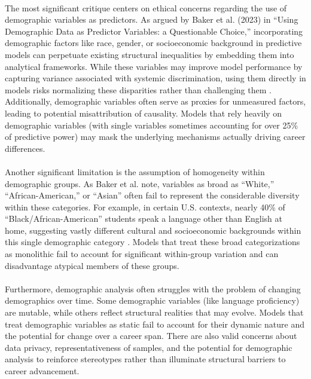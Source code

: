 \documentclass[../main.tex]{subfiles}
\begin{document}
\paragraph{} The most significant critique centers on ethical concerns regarding the use of demographic variables as predictors. As argued by Baker et al. (2023) in ``Using Demographic Data as Predictor Variables: a Questionable Choice,'' incorporating demographic factors like race, gender, or socioeconomic background in predictive models can perpetuate existing structural inequalities by embedding them into analytical frameworks. While these variables may improve model performance by capturing variance associated with systemic discrimination, using them directly in models risks normalizing these disparities rather than challenging them \citep{baker2023demographic}. Additionally, demographic variables often serve as proxies for unmeasured factors, leading to potential misattribution of causality. Models that rely heavily on demographic variables (with single variables sometimes accounting for over 25\% of predictive power) may mask the underlying mechanisms actually driving career differences.

\paragraph{} Another significant limitation is the assumption of homogeneity within demographic groups. As Baker et al. note, variables as broad as ``White,'' ``African-American,'' or ``Asian'' often fail to represent the considerable diversity within these categories. For example, in certain U.S. contexts, nearly 40\% of ``Black/African-American'' students speak a language other than English at home, suggesting vastly different cultural and socioeconomic backgrounds within this single demographic category \citep{baker2023demographic}. Models that treat these broad categorizations as monolithic fail to account for significant within-group variation and can disadvantage atypical members of these groups.

\paragraph{} Furthermore, demographic analysis often struggles with the problem of changing demographics over time. Some demographic variables (like language proficiency) are mutable, while others reflect structural realities that may evolve. Models that treat demographic variables as static fail to account for their dynamic nature and the potential for change over a career span. There are also valid concerns about data privacy, representativeness of samples, and the potential for demographic analysis to reinforce stereotypes rather than illuminate structural barriers to career advancement.
\end{document}

